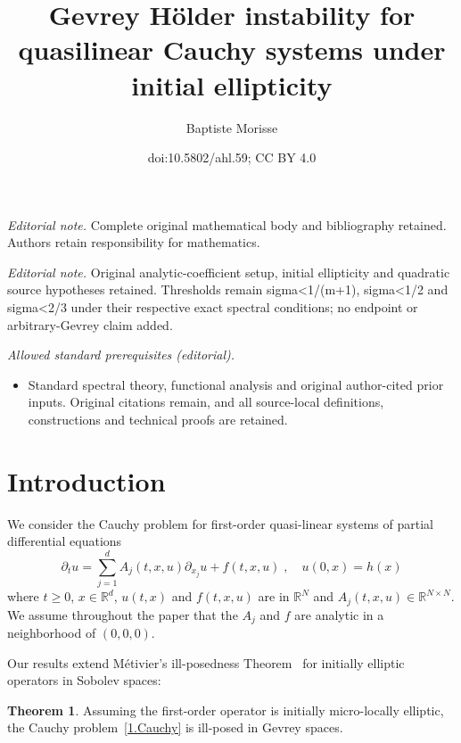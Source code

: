 \documentclass[10pt]{amsart}
\title{Gevrey Hölder instability for quasilinear Cauchy systems under initial ellipticity}
\author{Baptiste Morisse}
\date{doi:10.5802/ahl.59; CC BY 4.0}
\theoremstyle{definition}
\newtheorem*{theo*}{Theorem}
\theoremstyle{plain}
\newcommand*\R{{\mathbb R}}
\newcommand{\dptl}{\partial}%
\begin{document}
\maketitle
\noindent\textit{Editorial note.} Complete original mathematical body and bibliography retained. Authors retain responsibility for mathematics.\par\medskip
\noindent\textit{Editorial note.} Original analytic-coefficient setup, initial ellipticity and quadratic source hypotheses retained. Thresholds remain sigma<1/(m+1), sigma<1/2 and sigma<2/3 under their respective exact spectral conditions; no endpoint or arbitrary-Gevrey claim added.\par\medskip
\noindent\textit{Allowed standard prerequisites (editorial).}\begin{itemize}
\item Standard spectral theory, functional analysis and original author-cited prior inputs. Original citations remain, and all source-local definitions, constructions and technical proofs are retained.
\end{itemize}\medskip
\section{Introduction}

We consider the Cauchy problem for first-order quasi-linear systems of partial differential equations
\begin{equation}\label{1.Cauchy}
\dptl_{t}u = \sum_{j=1}^{d} A_{j}(t,x,u) \dptl_{x_j}u + f(t,x,u) \;,\quad u(0,x) = h(x)
\end{equation}
where $t\geq 0$, $x\in\R^{d}$, $u(t,x)$ and $f(t,x,u)$ are in $\R^N$ and $A_j(t,x,u)\in\R^{N\times N}$. We assume throughout the paper that the $A_j$ and $f$ are analytic in a neighborhood of $(0,0,0)$.

Our results extend Métivier's ill-posedness Theorem~\cite{metivier2005remarks} for initially elliptic operators in Sobolev spaces:
\begin{theo*}
Assuming the first-order operator is initially micro-locally elliptic, the Cauchy problem~\eqref{1.Cauchy} is ill-posed in Gevrey spaces.
\end{theo*}
\end{document}
